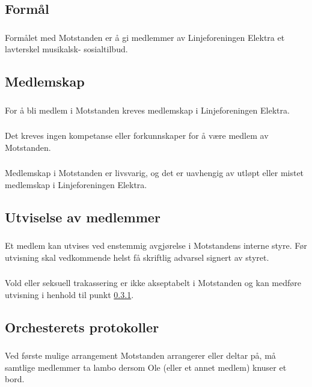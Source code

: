 \documentclass{article}
\newenvironment{statute}[1][]
    {
        \titleformat{\subsubsection}[runin]{\normalfont}{\hspace{1pt}\textit{\S\hspace{5pt}\thesubsubsection}}{0pt}{\rule{4pt}{0pt}}{}
        \subsubsection{}#1
        \begin{minipage}[t]{0.9\linewidth}
    }
    {
        \end{minipage}
        
        \ignorespacesafterend
    }
\begin{document}
        \subsection{Formål}
            \begin{statute}
                Formålet med Motstanden er å gi medlemmer av Linjeforeningen Elektra et lavterskel musikalsk- sosialtilbud.
        \end{statute}
        
        \subsection{Medlemskap}
            \begin{statute}
                For å bli medlem i Motstanden kreves medlemskap i Linjeforeningen Elektra.
            \end{statute}
            \begin{statute}
                Det kreves ingen kompetanse eller forkunnskaper for å være medlem av Motstanden.
            \end{statute}
            \begin{statute}
                Medlemskap i Motstanden er livsvarig, og det er uavhengig av utløpt eller mistet medlemskap i Linjeforeningen Elektra.            
            \end{statute}
        
        \subsection{Utviselse av medlemmer}
            \begin{statute}[\label{utvisning}]
                Et medlem kan utvises ved enstemmig avgjørelse i Motstandens interne styre. Før utvisning skal vedkommende helst få skriftlig advarsel signert av styret.
            \end{statute}
            \begin{statute}
                Vold eller seksuell trakassering er ikke akseptabelt i Motstanden og kan medføre utvisning i henhold til punkt \ref{utvisning}.
            \end{statute}


        \subsection{Orchesterets protokoller}
            \begin{statute}
                Ved første mulige arrangement Motstanden arrangerer eller deltar på, må samtlige medlemmer ta lambo dersom Ole (eller et annet medlem) knuser et bord.     
            \end{statute}
        
\end{document}
